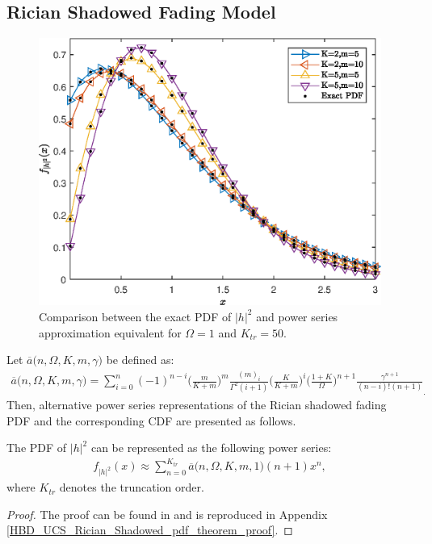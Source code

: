 \subsection{Rician Shadowed Fading Model}

\begin{figure} [t]
\centering
\vspace{0.2cm}
\includegraphics [width=0.45\columnwidth]{chap5_fig/pdf_comparison.eps} 
\caption{Comparison between the exact PDF of $|h|^2$ and power series approximation equivalent for $\Omega=1$ and $K_{tr}=50$.}
\label{fig:HBD_UCS_Rician_Shadowed_pdf_comparison}
\end{figure}

Let $\overline{a}\big(n,\Omega,K,m,\gamma\big)$ be defined as:
\begin{eqnarray} \label{HBD_UCS_Rician_Shadowed_rician_shad_cdf_exp}
\overline{a}\big(n,\Omega,K,m,\gamma\big) = \sum_{i=0}^n (-1)^{n-i} \bigg(\frac{m}{K+m}\bigg)^{m} \frac{(m)_i}{\Gamma^2(i+1)} \bigg(\frac{K}{K+m}\bigg)^{i} \bigg(\frac{1+K}{\Omega}\bigg)^{n+1} \frac{\gamma^{n+1}}{(n-i)!(n+1)}_.
\end{eqnarray}
Then, alternative power series representations of the Rician shadowed fading PDF and the corresponding CDF are presented as follows.

\begin{theorem} \label{HBD_UCS_Rician_Shadowed_pdf_theorem}
The PDF of $|h|^2$ can be represented as the following power series:
\begin{eqnarray} \label{HBD_UCS_Rician_Shadowed_rician_shad_pdf_pwr_srs}
f_{|h|^2}(x) \approx \sum_{n=0}^{K_{tr}} \overline{a}\big(n,\Omega,K,m,1\big)(n+1)x^n,
\end{eqnarray}
where $K_{tr}$ denotes the truncation order.
\end{theorem}
\begin{proof} 
The proof can be found in \cite{tan2018ricianShad} and is reproduced in Appendix \ref{HBD_UCS_Rician_Shadowed_pdf_theorem_proof}.
\end{proof}

